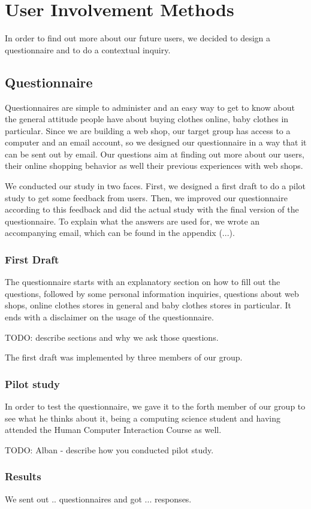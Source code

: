 \section{User Involvement Methods}
In order to find out more about our future users, we decided to design a questionnaire and to do a contextual inquiry. 

\subsection{Questionnaire}
Questionnaires are simple to administer and an easy way to get to know about the general attitude people have about buying clothes online, baby clothes in particular. Since we are building a web shop, our target group has access to a computer and an email account, so we designed our questionnaire in a way that it can be sent out by email. Our questions aim at finding out more about our users, their online shopping behavior as well their previous experiences with web shops. 

We conducted our study in two faces. First, we designed a first draft to do a pilot study to get some feedback from users. Then, we improved our questionnaire according to this feedback and did the actual study with the final version of the questionnaire. To explain what the answers are used for, we wrote an accompanying email, which can be found in the appendix (...).

\subsubsection{First Draft}
The questionnaire starts with an explanatory section on how to fill out the questions, followed by some personal information inquiries, questions about web shops, online clothes stores in general and baby clothes stores in particular. It ends with a disclaimer on the usage of the questionnaire.

TODO: describe sections and why we ask those questions.

The first draft was implemented by three members of our group.

\subsubsection{Pilot study}
In order to test the questionnaire, we gave it to the forth member of our group to see what he thinks about it, being a computing science student and having attended the Human Computer Interaction Course as well.

TODO: Alban - describe how you conducted pilot study.

\subsubsection{Results}
We sent out .. questionnaires and got ... responses.
